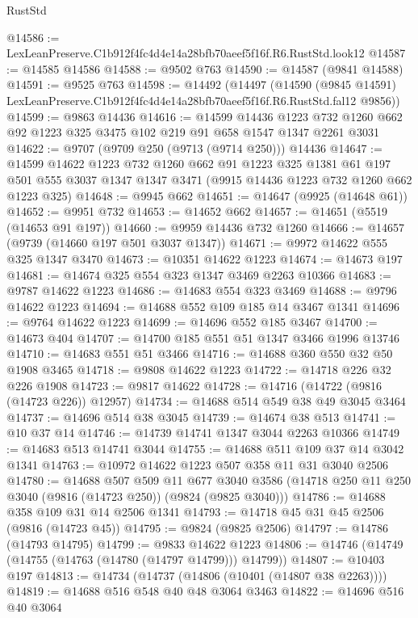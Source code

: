 \begin{lexlean}{RustStd}
\begin{coremodule}
@14586 := LexLeanPreserve.C1b912f4fc4d4e14a28bfb70aeef5f16f.R6.RustStd.look12
@14587 := @14585 @14586
@14588 := @9502 @763
@14590 := @14587 (@9841 @14588)
@14591 := @9525 @763
@14598 := @14492
    (@14497
      (@14590
        (@9845 @14591)
        LexLeanPreserve.C1b912f4fc4d4e14a28bfb70aeef5f16f.R6.RustStd.fal12
        @9856))
@14599 := @9863 @14436
@14616 := @14599
    @14436
    @1223
    @732
    @1260
    @662
    @92
    @1223
    @325
    @3475
    @102
    @219
    @91
    @658
    @1547
    @1347
    @2261
    @3031
@14622 := @9707 (@9709 @250 (@9713 (@9714 @250))) @14436
@14647 := @14599
    @14622
    @1223
    @732
    @1260
    @662
    @91
    @1223
    @325
    @1381
    @61
    @197
    @501
    @555
    @3037
    @1347
    @1347
    @3471
    (@9915 @14436 @1223 @732 @1260 @662 @1223 @325)
@14648 := @9945 @662
@14651 := @14647 (@9925 (@14648 @61))
@14652 := @9951 @732
@14653 := @14652 @662
@14657 := @14651 (@5519 (@14653 @91 @197))
@14660 := @9959 @14436 @732 @1260
@14666 := @14657 (@9739 (@14660 @197 @501 @3037 @1347))
@14671 := @9972 @14622 @555 @325 @1347 @3470
@14673 := @10351 @14622 @1223
@14674 := @14673 @197
@14681 := @14674 @325 @554 @323 @1347 @3469 @2263 @10366
@14683 := @9787 @14622 @1223
@14686 := @14683 @554 @323 @3469
@14688 := @9796 @14622 @1223
@14694 := @14688 @552 @109 @185 @14 @3467 @1341
@14696 := @9764 @14622 @1223
@14699 := @14696 @552 @185 @3467
@14700 := @14673 @404
@14707 := @14700 @185 @551 @51 @1347 @3466 @1996 @13746
@14710 := @14683 @551 @51 @3466
@14716 := @14688 @360 @550 @32 @50 @1908 @3465
@14718 := @9808 @14622 @1223
@14722 := @14718 @226 @32 @226 @1908
@14723 := @9817 @14622
@14728 := @14716 (@14722 (@9816 (@14723 @226)) @12957)
@14734 := @14688 @514 @549 @38 @49 @3045 @3464
@14737 := @14696 @514 @38 @3045
@14739 := @14674 @38 @513
@14741 := @10 @37 @14
@14746 := @14739 @14741 @1347 @3044 @2263 @10366
@14749 := @14683 @513 @14741 @3044
@14755 := @14688 @511 @109 @37 @14 @3042 @1341
@14763 := @10972 @14622 @1223 @507 @358 @11 @31 @3040 @2506
@14780 := @14688
    @507
    @509
    @11
    @677
    @3040
    @3586
    (@14718 @250 @11 @250 @3040 (@9816 (@14723 @250)) (@9824 (@9825 @3040)))
@14786 := @14688 @358 @109 @31 @14 @2506 @1341
@14793 := @14718 @45 @31 @45 @2506 (@9816 (@14723 @45))
@14795 := @9824 (@9825 @2506)
@14797 := @14786 (@14793 @14795)
@14799 := @9833 @14622 @1223
@14806 := @14746 (@14749 (@14755 (@14763 (@14780 (@14797 @14799))) @14799))
@14807 := @10403 @197
@14813 := @14734 (@14737 (@14806 (@10401 (@14807 @38 @2263))))
@14819 := @14688 @516 @548 @40 @48 @3064 @3463
@14822 := @14696 @516 @40 @3064

\end{coremodule}
\end{lexlean}
